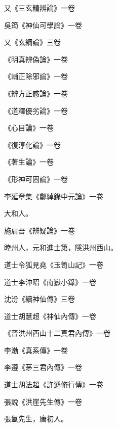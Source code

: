\begin{pinyinscope}
 又《三玄精辨論》一卷



 吳筠《神仙可學論》一卷



 又《玄綱論》三卷



 《明真辨偽論》一卷



 《輔正除邪論》一卷



 《辨方正惑論》一卷



 《道釋優劣論》一卷



 《心目論》一卷



 《復淳化論》一卷



 《著生論》一卷



 《形神可固論》一卷



 李延章集《鄭綽錄中元論》一卷



 大和人。



 施肩吾《辨疑論》一卷



 睦州人，元和進士第，隱洪州西山。



 道士令狐見堯《玉笥山記》一卷



 道士李沖昭《南嶽小錄》一卷



 沈汾《續神仙傳》三卷



 道士胡慧超《神仙內傳》一卷



 《晉洪州西山十二真君內傳》一卷



 李渤《真系傳》一卷



 李遵《茅三君內傳》一卷



 道士胡法超《許遜脩行傳》一卷



 張說《洪崖先生傳》一卷



 張氳先生，唐初人。




\end{pinyinscope}
